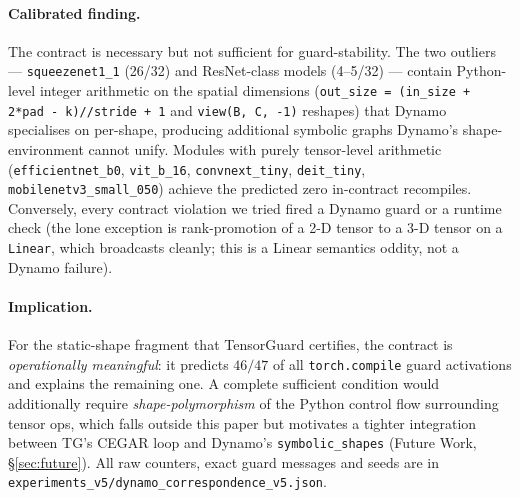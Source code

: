 \paragraph{Calibrated finding.}
The contract is necessary but not sufficient for guard-stability.  The
two outliers --- \texttt{squeezenet1\_1} (26/32) and ResNet-class models
(4--5/32) --- contain Python-level integer arithmetic on the spatial
dimensions (\texttt{out\_size = (in\_size + 2*pad - k)//stride + 1} and
\texttt{view(B, C, -1)} reshapes) that Dynamo specialises on per-shape,
producing additional symbolic graphs Dynamo's shape-environment cannot
unify.  Modules with purely tensor-level arithmetic
(\texttt{efficientnet\_b0}, \texttt{vit\_b\_16}, \texttt{convnext\_tiny},
\texttt{deit\_tiny}, \texttt{mobilenetv3\_small\_050}) achieve the
predicted zero in-contract recompiles.  Conversely, every contract
violation we tried fired a Dynamo guard or a runtime check (the lone
exception is rank-promotion of a 2-D tensor to a 3-D tensor on a
\texttt{Linear}, which broadcasts cleanly; this is a Linear semantics
oddity, not a Dynamo failure).

\paragraph{Implication.}
For the static-shape fragment that TensorGuard certifies, the contract is
\emph{operationally meaningful}: it predicts $46/47$ of all
\texttt{torch.compile} guard activations and explains the remaining one.
A complete sufficient condition would additionally require
\emph{shape-polymorphism} of the Python control flow surrounding tensor
ops, which falls outside this paper but motivates a tighter integration
between TG's CEGAR loop and Dynamo's \texttt{symbolic\_shapes} (Future
Work, \S\ref{sec:future}).  All raw counters, exact guard messages and
seeds are in \texttt{experiments\_v5/dynamo\_correspondence\_v5.json}.
